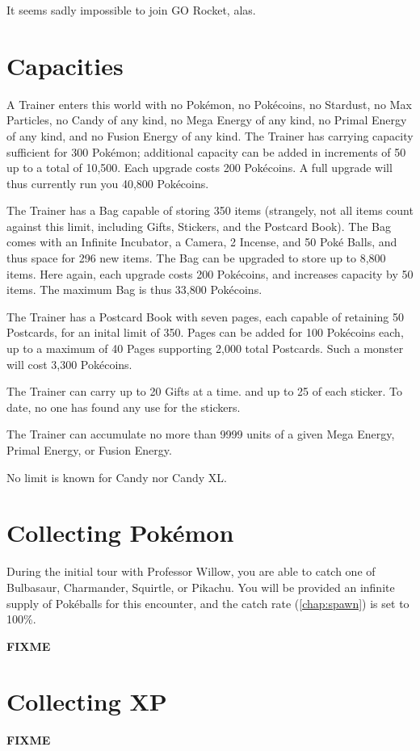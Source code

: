 It seems sadly impossible to join GO Rocket, alas.

\section{Capacities}
A Trainer enters this world with no Pokémon, no Pokécoins, no Stardust,
  no Max Particles, no Candy of any kind, no Mega Energy of any kind,
  no Primal Energy of any kind, and no Fusion Energy of any kind.
The Trainer has carrying capacity sufficient for 300 Pokémon; additional
  capacity can be added in increments of 50 up to a total of 10,500.
Each upgrade costs 200 Pokécoins.
A full upgrade will thus currently run you 40,800 Pokécoins.

The Trainer has a Bag capable of storing 350 items (strangely, not all items
  count against this limit, including Gifts, Stickers, and the Postcard Book).
The Bag comes with an Infinite Incubator, a Camera, 2 Incense, and 50 Poké Balls,
  and thus space for 296 new items.
The Bag can be upgraded to store up to 8,800 items.
Here again, each upgrade costs 200 Pokécoins, and increases capacity by 50 items.
The maximum Bag is thus 33,800 Pokécoins.

The Trainer has a Postcard Book with seven pages, each capable of retaining
 50 Postcards, for an inital limit of 350.
Pages can be added for 100 Pokécoins each, up to a maximum of 40 Pages
 supporting 2,000 total Postcards.
Such a monster will cost 3,300 Pokécoins.

The Trainer can carry up to 20 Gifts at a time. and up to 25 of each sticker.
To date, no one has found any use for the stickers.

The Trainer can accumulate no more than 9999 units of a given Mega Energy,
 Primal Energy, or Fusion Energy.

No limit is known for Candy nor Candy XL.

\section{Collecting Pokémon}
During the initial tour with Professor Willow, you are able to catch one of
 Bulbasaur, Charmander, Squirtle, or Pikachu.
You will be provided an infinite supply of Pokéballs for this encounter, and
 the catch rate (\autoref{chap:spawn}) is set to 100\%.

\textbf{FIXME}

\section{Collecting XP}
\textbf{FIXME}


